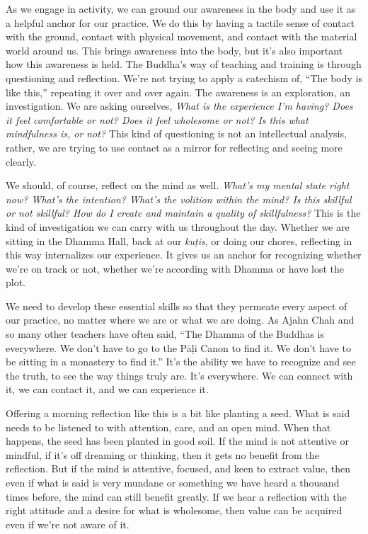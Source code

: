 
As we engage in activity, we can ground our awareness in the body and 
use it as a helpful anchor for our practice. We do this by having a 
tactile sense of contact with the ground, contact with physical 
movement, and contact with the material world around us. This brings 
awareness into the body, but it's also important how this awareness is 
held. The Buddha's way of teaching and training is through questioning 
and reflection. We're not trying to apply a catechism of, ``The body is 
like this,'' repeating it over and over again. The awareness is an 
exploration, an investigation. We are asking ourselves, \emph{What is 
the experience I'm having? Does it feel comfortable or not? Does it 
feel wholesome or not? Is this what mindfulness is, or not?} This kind 
of questioning is not an intellectual analysis, rather, we are trying 
to use contact as a mirror for reflecting and seeing more clearly.

We should, of course, reflect on the mind as well. \emph{What's my 
mental state right now? What's the intention? What's the volition 
within the mind? Is this skillful or not skillful? How do I create and 
maintain a quality of skillfulness?} This is the kind of investigation 
we can carry with us throughout the day. Whether we are sitting in the 
Dhamma Hall, back at our \emph{kuṭis}, or doing our chores, 
reflecting in this way internalizes our experience. It gives us an 
anchor for recognizing whether we're on track or not, whether we're 
according with Dhamma or have lost the plot.

We need to develop these essential skills so that they permeate every 
aspect of our practice, no matter where we are or what we are doing. As 
Ajahn Chah and so many other teachers have often said, ``The Dhamma of 
the Buddhas is everywhere. We don't have to go to the Pāḷi Canon to 
find it. We don't have to be sitting in a monastery to find it.'' It's 
the ability we have to recognize and see the truth, to see the way 
things truly are. It's everywhere. We can connect with it, we can 
contact it, and we can experience it.


Offering a morning reflection like this is a bit like planting a seed. 
What is said needs to be listened to with attention, care, and an open 
mind. When that happens, the seed has been planted in good soil. If the 
mind is not attentive or mindful, if it's off dreaming or thinking, 
then it gets no benefit from the reflection. But if the mind is 
attentive, focused, and keen to extract value, then even if what is 
said is very mundane or something we have heard a thousand times 
before, the mind can still benefit greatly. If we hear a reflection 
with the right attitude and a desire for what is wholesome, then value 
can be acquired even if we're not aware of it.


